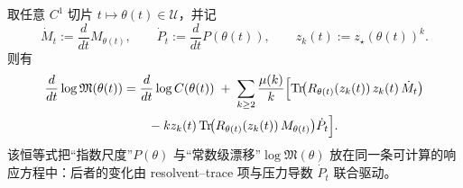 \begin{remark}\label{cor:logM-two-scale-coupling}
取任意 $C^1$ 切片 $t\mapsto \theta(t)\in\mathcal{U}$，并记
\[
\dot{M}_t:=\frac{d}{dt}M_{\theta(t)},\qquad
\dot{P}_t:=\frac{d}{dt}P(\theta(t)),\qquad
z_k(t):=z_\star(\theta(t))^k.
\]
则有
\[
\begin{aligned}
\frac{d}{dt}\log\mathfrak{M}(\theta(t))
&=\frac{d}{dt}\log C(\theta(t))
\;+\;\sum_{k\ge 2}\frac{\mu(k)}{k}\Bigl[
\mathrm{Tr}\!\bigl(R_{\theta(t)}(z_k(t))\,z_k(t)\,\dot{M}_t\bigr)\\
&\qquad -k z_k(t)\,\mathrm{Tr}\!\bigl(R_{\theta(t)}(z_k(t))\,M_{\theta(t)}\bigr)\dot{P}_t
\Bigr].
\end{aligned}
\]
该恒等式把“指数尺度”$P(\theta)$ 与“常数级漂移”$\log\mathfrak{M}(\theta)$ 放在同一条可计算的响应方程中：后者的变化由 resolvent--trace 项与压力导数 $\dot P_t$ 联合驱动。
\end{remark}


